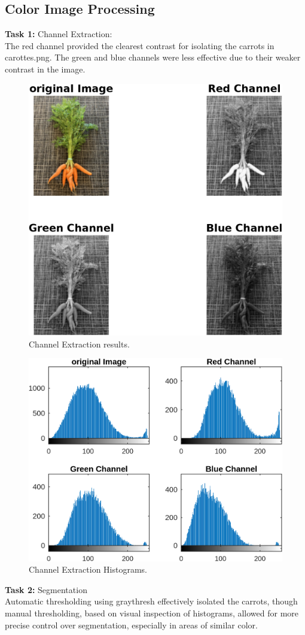 \documentclass[a4paper,12pt]{article}
\begin{document}
\begin{multicols}{2}
\subsection{Color Image Processing}
\textbf{Task 1:} Channel Extraction:\\
The red channel provided the clearest contrast for isolating the carrots in carottes.png. The green and blue channels were less effective due to their weaker contrast in the image.

\begin{figure}[H]
    \centering
    \includegraphics[width=0.50\linewidth]{Images/Figure 10.png} 
    \caption{Channel Extraction results.}
    \label{fig:dynamic_range_expansion}
\end{figure}

\begin{figure}[H]
    \centering
    \includegraphics[width=0.50\linewidth]{Images/Figure 11.png} 
    \caption{Channel Extraction Histograms.}
    \label{fig:dynamic_range_expansion}
\end{figure}

\textbf{Task 2:} Segmentation\\
Automatic thresholding using graythresh effectively isolated the carrots, though manual thresholding, based on visual inspection of histograms, allowed for more precise control over segmentation, especially in areas of similar color.


\end{multicols}
\end{document}
